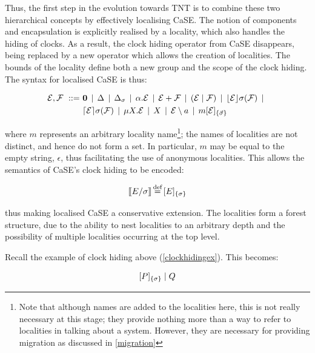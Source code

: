 Thus, the first step in the evolution towards TNT is to combine these
two hierarchical concepts by effectively localising CaSE.  The notion of
components and encapsulation is explicitly realised by a locality, which
also handles the hiding of clocks.  As a result, the clock hiding
operator from CaSE disappears, being replaced by a new operator which
allows the creation of localities.  The bounds of the locality define
both a new group and the scope of the clock hiding.  The syntax for
localised CaSE is thus:

\begin{equation}
  \begin{aligned}
    \text{$\mathcal{E}$}, \text{$\mathcal{F}$}\ ::=\ &
    \textbf{0}  \;\,|\,\; 
    \Delta \;\,|\,\; 
    \Delta_{\sigma} \;\,|\,\; 
    \alpha . \text{$\mathcal{E}$}  \;\,|\,\;
    \text{$\mathcal{E}$} + \text{$\mathcal{F}$} \;\,|\,\; 
    (\text{$\mathcal{E}$}\;|\;\text{$\mathcal{F}$})\;\,|\,\; 
    \lfloor{\text{$\mathcal{E}$}}\rfloor {\sigma} ({\text{$\mathcal{F}$}}) \;\,|\,\; \\
    & \lceil{\text{$\mathcal{E}$}}\rceil {\sigma} ({\text{$\mathcal{F}$}}) \;\,|\,\; 
    \mu X . \text{$\mathcal{E}$} \;\,|\,\; 
    X \;\,|\,\; 
    \text{$\mathcal{E}$} \setminus a \;\,|\,\; 
    {m}[ \text{$\mathcal{E}$} ]_{\{\vec{\sigma}\}}
  \end{aligned}
\end{equation}

\noindent where $m$ represents an arbitrary locality name\footnote{Note
that although names are added to the localities here, this is not really
necessary at this stage; they provide nothing more than a way to refer
to localities in talking about a system.  However, they are necessary
for providing migration as discussed in \ref{migration}}; the names of
localities are not distinct, and hence do not form a set.  In
particular, $m$ may be equal to the empty string, $\epsilon$, thus
facilitating the use of anonymous localities.  This allows the semantics
of CaSE's clock hiding to be encoded:

\begin{equation}
[\hspace{-0.3ex}[ E / \sigma ]\hspace{-0.3ex}] \operatorname{\stackrel{\textrm{def}}{=}} {}[ E ]_{\{\sigma\}}
\end{equation}

\noindent thus making localised CaSE a conservative extension.  The
localities form a forest structure, due to the ability to nest
localities to an arbitrary depth and the possibility of multiple
localities occurring at the top level.

Recall the example of clock hiding above (\ref{clockhidingex}).  This
becomes:

\begin{equation}
  {}[ P ]_{\{\sigma\}}\;|\;Q
\end{equation}

